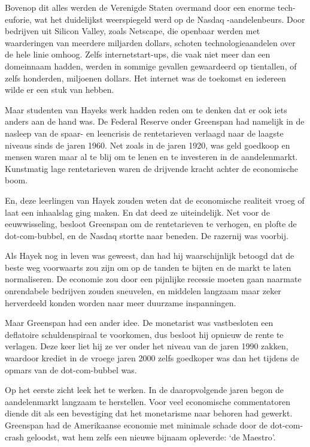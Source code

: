 \documentclass[smalldemyvopaper,11pt,twoside,onecolumn,openright,extrafontsizes,hidelinks]{memoir}
\begin{document}
Bovenop dit alles werden de Verenigde Staten overmand door een enorme
tech-euforie, wat het duidelijkst weerspiegeld werd op de Nasdaq
-aandelenbeurs. Door bedrijven uit Silicon Valley, zoals Netscape, die
openbaar werden met waarderingen van meerdere miljarden dollars, schoten
technologieaandelen over de hele linie omhoog. Zelfs internetstart-ups,
die vaak niet meer dan een domeinnaam hadden, werden in sommige gevallen
gewaardeerd op tientallen, of zelfs honderden, miljoenen dollars. Het
internet was de toekomst en iedereen wilde er een stuk van hebben.

Maar studenten van Hayeks werk hadden reden om te denken dat er ook iets
anders aan de hand was. De Federal Reserve onder Greenspan had namelijk
in de nasleep van de spaar- en leencrisis de rentetarieven verlaagd naar
de laagste niveaus sinds de jaren 1960. Net zoals in de jaren 1920, was
geld goedkoop en mensen waren maar al te blij om te lenen en te
investeren in de aandelenmarkt. Kunstmatig lage rentetarieven waren de
drijvende kracht achter de economische boom.

En, deze leerlingen van Hayek zouden weten dat de economische realiteit
vroeg of laat een inhaalslag ging maken. En dat deed ze uiteindelijk.
Net voor de eeuwwisseling, besloot Greenspan om de rentetarieven te
verhogen, en plofte de dot-com-bubbel, en de Nasdaq stortte naar
beneden. De razernij was voorbij.

Als Hayek nog in leven was geweest, dan had hij waarschijnlijk betoogd
dat de beste weg voorwaarts zou zijn om op de tanden te bijten en de
markt te laten normaliseren. De economie zou door een pijnlijke recessie
moeten gaan naarmate onrendabele bedrijven zouden sneuvelen, en middelen
langzaam maar zeker herverdeeld konden worden naar meer duurzame
inspanningen.

Maar Greenspan had een ander idee. De monetarist was vastbesloten een
deflatoire schuldenspiraal te voorkomen, dus besloot hij opnieuw de
rente te verlagen. Deze keer liet hij ze ver onder het niveau van de
jaren 1990 zakken, waardoor krediet in de vroege jaren 2000 zelfs
goedkoper was dan het tijdens de opmars van de dot-com-bubbel was.

Op het eerste zicht leek het te werken. In de daaropvolgende jaren begon
de aandelenmarkt langzaam te herstellen. Voor veel economische
commentatoren diende dit als een bevestiging dat het monetarisme naar
behoren had gewerkt. Greenspan had de Amerikaanse economie met minimale
schade door de dot-com-crash geloodst, wat hem zelfs een nieuwe bijnaam
opleverde: `de Maestro'.
\end{document}
